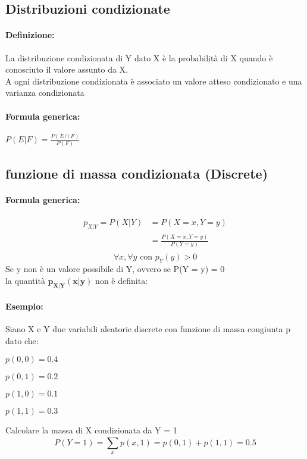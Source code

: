 \documentclass[]{article}
\newcommand{\definizione}{\paragraph{Definizione:}}
\newcommand{\formula}{\paragraph{Formula generica:}}
\begin{document}
    \newpage
    \subsection{Distribuzioni condizionate}
    \definizione La distribuzione condizionata di Y dato X è la probabilità di X quando è conosciuto il valore assunto da X. \\
    A ogni distribuzione condizionata è associato un valore atteso condizionato e una varianza condizionata
    \formula $P(E|F) = \frac{P(E \cap F)}{P(F)}$

    \subsection{funzione di massa condizionata (Discrete)}
    \formula
    \begin{equation*}
        \begin{split}
            p_{X|Y}= P(X | Y) & = P (X=x, Y=y) \\
            & = \frac{P(X=x, Y=y)}{P(Y=y)} \\
        \end{split}
    \end{equation*}
    \[ \forall x, \forall y \text{ con } p_Y(y) > 0\]
    \linebreak[4]
    Se y non è un valore possibile di Y, ovvero se P(Y = y) = 0 \\
    la quantità $\boldsymbol{p_{X|Y}(x|y)}$ non è definita:
    
    \paragraph{Esempio:} Siano X e Y due variabili aleatorie discrete con funzione di massa congiunta p dato che: 
    \begin{center}
        \begin{minipage}{0.2\textwidth}
            $p(0,0) = 0.4$
        \end{minipage}
        \begin{minipage}{0.2\textwidth}
            $p(0,1) = 0.2$
        \end{minipage}
        \begin{minipage}{0.2\textwidth}
            $p(1,0) = 0.1$
        \end{minipage}
        \begin{minipage}{0.2\textwidth}
            $p(1,1) = 0.3$
        \end{minipage}
    \end{center}
    Calcolare la massa di X condizionata da Y = 1
    \[ P(Y = 1) = \sum_{x}^{} p(x, 1) = p(0,1) + p(1,1) = 0.5 \]
\end{document}
